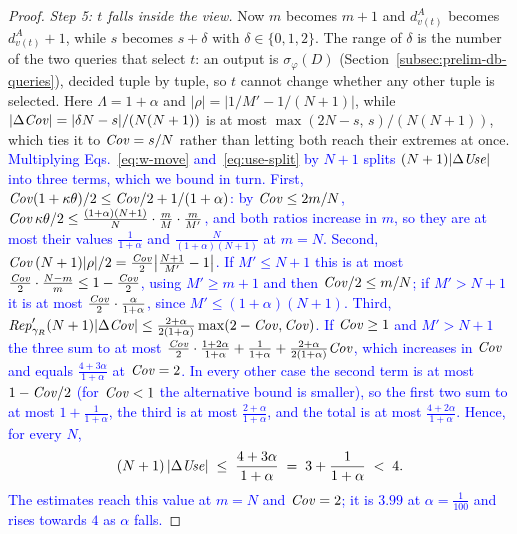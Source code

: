 \begin{proof}
{\emph{Step 5: $t$ falls inside the view.}
Now $m$ becomes $m+1$ and $d^A_{v(t)}$ becomes $d^A_{v(t)}+1$, while $s$ becomes $s+\delta$ with
$\delta\in\{0,1,2\}$.
The range of $\delta$ is the number of the two queries that select $t$: an output is
$\sigma_\varphi(D)$ (Section~\ref{subsec:prelim-db-queries}), decided tuple by tuple, so $t$
cannot change whether any other tuple is selected.
Here $\Lambda=1+\alpha$ and $|\rho|=|1/M'-1/(N+1)|$, while $|\Delta\mathit{Cov}|=|\delta N-s|/(N(N+1))$
is at most $\max(2N-s,\,s)/(N(N+1))$, which ties it to $\mathit{Cov}=s/N$ rather than letting both reach
their extremes at once.
\textcolor{blue}{Multiplying Eqs.~\eqref{eq:w-move} and~\eqref{eq:use-split} by $N+1$ splits
$(N+1)|\Delta\mathit{Use}|$ into three terms, which we bound in turn.
First, $\mathit{Cov}(1+\kappa\theta)/2\le\mathit{Cov}/2+1/(1+\alpha)$: by $\mathit{Cov}\le2m/N$,
$\mathit{Cov}\,\kappa\theta/2\le\frac{(1+\alpha)(N+1)}{N}\cdot\frac{m}{M}\cdot\frac{m}{M'}$, and both ratios
increase in $m$, so they are at most their values $\frac1{1+\alpha}$ and
$\frac{N}{(1+\alpha)(N+1)}$ at $m=N$.
Second, $\mathit{Cov}\,(N+1)|\rho|/2=\frac{\mathit{Cov}}{2}\big|\frac{N+1}{M'}-1\big|$.
If $M'\le N+1$ this is at most $\frac{\mathit{Cov}}{2}\cdot\frac{N-m}{m}\le1-\frac{\mathit{Cov}}{2}$, using
$M'\ge m+1$ and then $\mathit{Cov}/2\le m/N$; if $M'>N+1$ it is at most
$\frac{\mathit{Cov}}{2}\cdot\frac{\alpha}{1+\alpha}$, since $M'\le(1+\alpha)(N+1)$.
Third, $\mathit{Rep}'_{\gamma_R}(N+1)|\Delta\mathit{Cov}|\le\frac{2+\alpha}{2(1+\alpha)}\max(2-\mathit{Cov},\mathit{Cov})$.
If $\mathit{Cov}\ge1$ and $M'>N+1$ the three sum to at most
$\frac{\mathit{Cov}}{2}\cdot\frac{1+2\alpha}{1+\alpha}+\frac1{1+\alpha}+\frac{2+\alpha}{2(1+\alpha)}\mathit{Cov}$,
which increases in $\mathit{Cov}$ and equals $\frac{4+3\alpha}{1+\alpha}$ at $\mathit{Cov}=2$.
In every other case the second term is at most $1-\mathit{Cov}/2$ (for $\mathit{Cov}<1$ the alternative bound is
smaller), so the first two sum to at most $1+\frac1{1+\alpha}$, the third is at most
$\frac{2+\alpha}{1+\alpha}$, and the total is at most $\frac{4+2\alpha}{1+\alpha}$.
Hence, for every $N$,
\[
(N+1)\,|\Delta\mathit{Use}|\;\le\;\frac{4+3\alpha}{1+\alpha}\;=\;3+\frac{1}{1+\alpha}\;<\;4 .
\]
The estimates reach this value at $m=N$ and $\mathit{Cov}=2$; it is $3.99$ at $\alpha=\tfrac1{100}$ and
rises towards $4$ as $\alpha$ falls.}

}
\end{proof}
